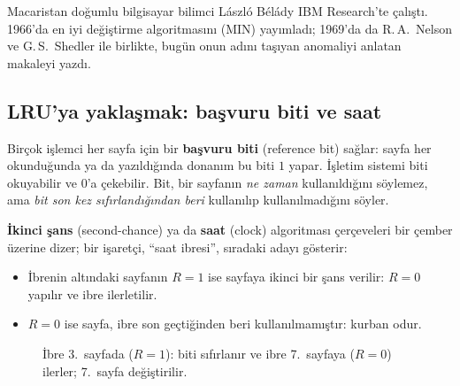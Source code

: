 \documentclass[11pt,a4paper]{article}
\newcommand{\term}[1]{\textbf{\color{mintdeep}#1}}
\begin{document}
\begin{histnote}
Macaristan doğumlu bilgisayar bilimci László Bélády IBM Research'te çalıştı. 1966'da en iyi değiştirme algoritmasını (MIN) yayımladı; 1969'da da R.\,A.\ Nelson ve G.\,S.\ Shedler ile birlikte, bugün onun adını taşıyan anomaliyi anlatan makaleyi yazdı.
\end{histnote}

\subsection{LRU'ya yaklaşmak: başvuru biti ve saat}
\label{sec:clock}

Birçok işlemci her sayfa için bir \term{başvuru biti} (reference bit) sağlar: sayfa her okunduğunda ya da yazıldığında donanım bu biti $1$ yapar. İşletim sistemi biti okuyabilir ve $0$'a çekebilir. Bit, bir sayfanın \emph{ne zaman} kullanıldığını söylemez, ama \emph{bit son kez sıfırlandığından beri} kullanılıp kullanılmadığını söyler.

\term{İkinci şans} (second-chance) ya da \term{saat} (clock) algoritması çerçeveleri bir çember üzerine dizer; bir işaretçi, ``saat ibresi'', sıradaki adayı gösterir:
\begin{itemize}
  \item İbrenin altındaki sayfanın $R = 1$ ise sayfaya ikinci bir şans verilir: $R = 0$ yapılır ve ibre ilerletilir.
  \item $R = 0$ ise sayfa, ibre son geçtiğinden beri kullanılmamıştır: kurban odur.
\end{itemize}

\begin{figure}[H]
\centering
{}
\caption{İbre 3.\ sayfada ($R=1$): biti sıfırlanır ve ibre 7.\ sayfaya ($R=0$) ilerler; 7.\ sayfa değiştirilir.}
\end{figure}
\end{document}
